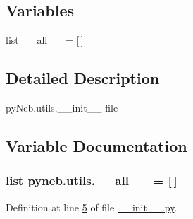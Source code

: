 \subsection*{Variables}
\begin{DoxyCompactItemize}
\item 
list \hyperlink{namespacepyneb_1_1utils_a4cbc363c80d46a33717a18a0b4fcd281}{\-\_\-\-\_\-all\-\_\-\-\_\-} = \mbox{[}$\,$\mbox{]}
\end{DoxyCompactItemize}


\subsection{Detailed Description}
\begin{DoxyVerb}pyNeb.utils.__init__ file
\end{DoxyVerb}
 

\subsection{Variable Documentation}
\hypertarget{namespacepyneb_1_1utils_a4cbc363c80d46a33717a18a0b4fcd281}{
\subsubsection[{\-\_\-\-\_\-all\-\_\-\-\_\-}]{\setlength{\rightskip}{0pt plus 5cm}list pyneb.\-utils.\-\_\-\-\_\-all\-\_\-\-\_\- = \mbox{[}$\,$\mbox{]}}}\label{namespacepyneb_1_1utils_a4cbc363c80d46a33717a18a0b4fcd281}


Definition at line \hyperlink{utils_2____init_____8py_source_l00005}{5} of file \hyperlink{utils_2____init_____8py_source}{\-\_\-\-\_\-init\-\_\-\-\_\-.\-py}.

